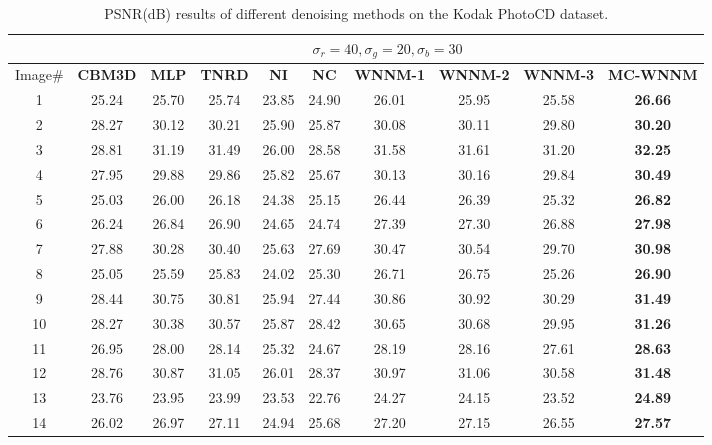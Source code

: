 \documentclass[10pt,onecolumn,letterpaper]{article}
\begin{document}
\begin{table}
\vspace{0mm}
\caption{PSNR(dB) results of different denoising methods on the Kodak PhotoCD dataset.}
\label{t1}
\label{taba}
\begin{center}
\renewcommand\arraystretch{1.0}
\footnotesize
\begin{tabular}{|c||c|c|c|c|c|c|c|c|c|}
\hline
&\multicolumn{9}{c|}{ $\sigma_{r} = 40, \sigma_{g} = 20, \sigma_{b} = 30$}
\\
\hline
\hline
Image\#
&
\textbf{CBM3D}
&
\textbf{MLP}
&
\textbf{TNRD}
&
\textbf{NI}
&
\textbf{NC}
&
\textbf{WNNM-1}
&
\textbf{WNNM-2}
&
\textbf{WNNM-3}
&
\textbf{MC-WNNM}
\\
\hline
1& 25.24 & 25.70 & 25.74 & 23.85 & 24.90 & 26.01 & 25.95 & 25.58 & \textbf{26.66}
\\
\hline
2& 28.27 & 30.12 & 30.21 & 25.90 & 25.87 & 30.08 & 30.11 & 29.80 & \textbf{30.20} 
\\
\hline
3 & 28.81 & 31.19 & 31.49 & 26.00 & 28.58 & 31.58 & 31.61 & 31.20 & \textbf{32.25}  
\\
\hline 
4 & 27.95 & 29.88 & 29.86 & 25.82 & 25.67 & 30.13 & 30.16 & 29.84 & \textbf{30.49} 
\\
\hline
5 & 25.03 & 26.00 & 26.18 & 24.38 & 25.15 & 26.44 & 26.39 & 25.32 & \textbf{26.82}
\\
\hline
6 & 26.24 & 26.84 & 26.90 & 24.65 & 24.74 & 27.39 & 27.30 & 26.88 & \textbf{27.98} 
\\
\hline
7 & 27.88 & 30.28 & 30.40 & 25.63 & 27.69 & 30.47 & 30.54 & 29.70 & \textbf{30.98} 
\\
\hline
8 & 25.05 & 25.59 & 25.83 & 24.02 & 25.30 & 26.71 & 26.75 & 25.26 & \textbf{26.90}
\\
\hline
9 & 28.44 & 30.75 & 30.81 & 25.94 & 27.44 & 30.86 & 30.92 & 30.29 & \textbf{31.49}
\\
\hline
10 & 28.27 & 30.38 & 30.57 & 25.87 & 28.42 & 30.65 & 30.68 & 29.95 & \textbf{31.26}
\\
\hline
11 & 26.95 & 28.00 & 28.14 & 25.32 & 24.67 & 28.19 & 28.16 & 27.61 & \textbf{28.63}
\\
\hline
12 & 28.76 & 30.87 & 31.05 & 26.01 & 28.37 & 30.97 & 31.06 & 30.58 & \textbf{31.48}
\\
\hline
13 & 23.76 & 23.95 & 23.99 & 23.53 & 22.76 & 24.27 & 24.15 & 23.52 & \textbf{24.89}
\\
\hline
14 & 26.02 & 26.97 & 27.11 & 24.94  & 25.68 & 27.20 & 27.15 & 26.55 & \textbf{27.57}
\\

\end{tabular}
\end{center}
\end{table}
\end{document}

